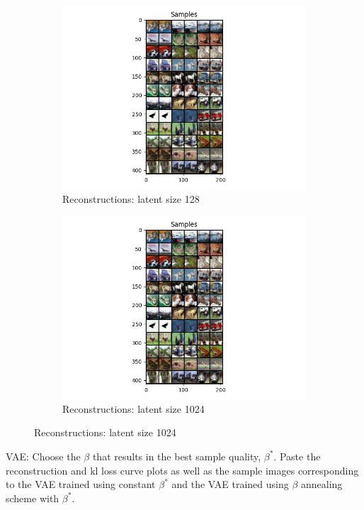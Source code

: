 \documentclass[11pt,addpoints,answers]{exam}
\numberwithin{equation}{section} %
\numberwithin{figure}{section} %
\numberwithin{table}{section} %
\begin{document}
\begin{questions}
\begin{figure}[H]
\begin{subfigure}[b]{0.32\linewidth}
        \includegraphics[width=\linewidth]{2.1_128_recon.png}
        \caption{Reconstructions: latent size 128}
    \end{subfigure}
    \begin{subfigure}[b]{0.32\linewidth}
        \includegraphics[width=\linewidth]{2.1_1024_recon.png}
        \caption{Reconstructions: latent size 1024}
    \end{subfigure}
\end{figure}
\question VAE: Choose the $\beta$ that results in the best sample quality, $\beta^*$. Paste the reconstruction and kl loss curve plots as well as the sample images corresponding to the VAE trained using constant $\beta^*$ and the VAE trained using $\beta$ annealing scheme with $\beta^*$.

\end{questions}
\end{document}
